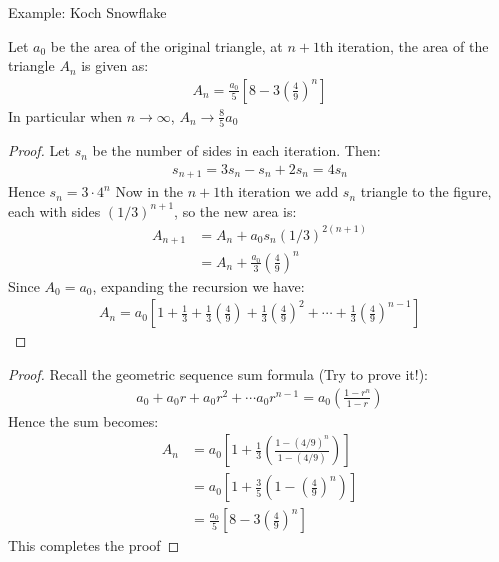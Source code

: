 \documentclass[10pt,xcolor={table,dvipsnames},t]{beamer}
\begin{document}
\begin{frame}{Example: Koch Snowflake}
  \begin{theorem}
    Let $a_0$ be the area of the original triangle, at $n+1$th iteration, the area of the triangle $A_n$ is given as:
    \begin{align*}
      A_n = \frac{a_0}{5} \left[8-3\left(\frac{4}{9}\right)^n\right]
    \end{align*} 
    In particular when $n\to \infty$, $A_n \to \frac{8}{5} a_0$
  \end{theorem}
\end{frame}

\begin{frame}
  \begin{proof}
    Let $s_n$ be the number of sides in each iteration. Then:
    \begin{align*}
      s_{n+1} = 3 s_n - s_n + 2s_n = 4s_n
    \end{align*}
    Hence $s_n = 3\cdot 4^n$
    Now in the $n+1$th iteration we add $s_n$ triangle to the figure, each with sides $(1/3)^{n+1}$, so the new area is:
    \begin{align*}
      A_{n+1} &= A_{n} + a_0 s_n \left(1/3\right)^{2(n+1)}\\
      &= A_{n} + \frac{a_0}{3} \left(\frac{4}{9}\right)^n
    \end{align*}
    Since $A_0=a_0$, expanding the recursion we have:
    \begin{align*}
      A_n = a_0 \left[1 + \frac{1}{3} + \frac{1}{3}\left(\frac{4}{9}\right) + \frac{1}{3}\left(\frac{4}{9}\right)^2 + \cdots + \frac{1}{3}\left(\frac{4}{9}\right)^{n-1}\right] 
    \end{align*}
    \renewcommand{\qedsymbol}{}
  \end{proof}
\end{frame}

\begin{frame}
  \begin{proof}
    Recall the geometric sequence sum formula (Try to prove it!):
    \begin{align*}
      a_0 + a_0 r + a_0 r^2 + \cdots a_0 r^{n-1} = a_0 \left(\frac{1-r^n}{1-r}\right)
    \end{align*}
    Hence the sum becomes:
    \begin{align*}
      A_n &= a_0 \left[1+ \frac{1}{3} \left(\frac{1-(4/9)^n}{1-(4/9)}\right)\right]\\
      &= a_0 \left[1+ \frac{3}{5}\left(1-\left(\frac{4}{9}\right)^n\right)\right]\\
      &= \frac{a_0}{5} \left[8-3\left(\frac{4}{9}\right)^n\right]
    \end{align*}
    This completes the proof
  \end{proof}
\end{frame}
\end{document}
